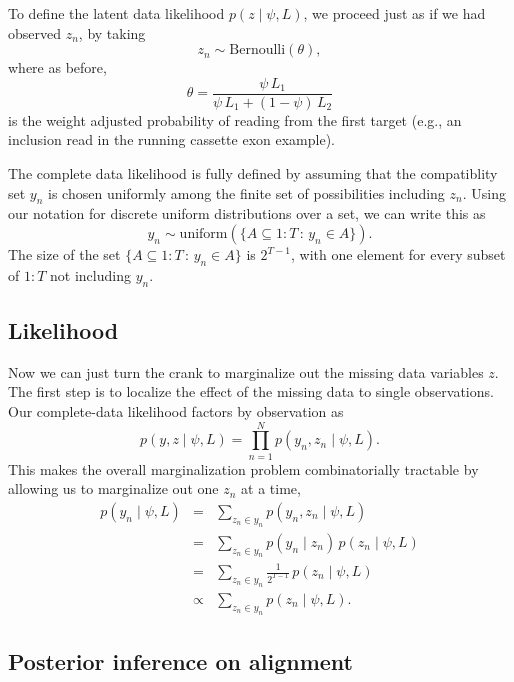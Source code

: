 \documentclass[11pt]{report}
\newcommand{\rngto}[1]{1{:}#1}
\newcommand{\setcomp}[2]{\{ #1 \, : \, #2 \}}
\begin{document}
To define the latent data likelihood $p(z \mid \psi, L)$, we proceed
just as if we had observed $z_n$, by taking
\[
  z_n \sim \textrm{Bernoulli}(\theta),
\]
where as before,
\[
  \theta = \frac{\psi \, L_1}{\psi \, L_1 + (1 - \psi) \, L_2}
\]
is the weight adjusted probability of reading from the first target
(e.g., an inclusion read in the running cassette exon example).

The complete data likelihood is fully defined by
assuming that the compatiblity set $y_n$ is chosen uniformly among
the finite set of possibilities including $z_n$.  Using our notation
for discrete uniform distributions over a set, we can write this as
\[
  y_n \sim \textrm{uniform}\!\left(\setcomp{A \subseteq \rngto{T}}{y_n
      \in A}\right).
\]
The size of the set $\setcomp{A \subseteq \rngto{T}}{y_n \in A}$ is
$2^{T-1}$, with one element for every subset of $\rngto{T}$ not
including $y_n$.

\subsection{Likelihood}

Now we can just turn the crank to marginalize out the missing data
variables $z$.  The first step is to localize the effect of the
missing data to single observations.  Our complete-data likelihood
factors by observation as
\[
  p(y, z \mid \psi, L)
  = \prod_{n=1}^N p(y_n, z_n \mid \psi, L).
\]
This makes the overall marginalization problem combinatorially
tractable by allowing us to marginalize out one $z_n$ at a time,
%
\begin{eqnarray*}
  p(y_n \mid \psi, L)
  & = & \sum_{z_n \in y_n} p(y_n, z_n \mid \psi, L)
  \\
  & = & \sum_{z_n \in y_n} p(y_n \mid z_n) \, p(z_n \mid \psi, L)
  \\
  & = & \sum_{z_n \in y_n} \frac{1}{2^{T-1}} \, p(z_n \mid \psi, L)
  \\
  & \propto & \sum_{z_n \in y_n} p(z_n \mid \psi, L).
\end{eqnarray*}

\subsection{Posterior inference on alignment}
\end{document}
